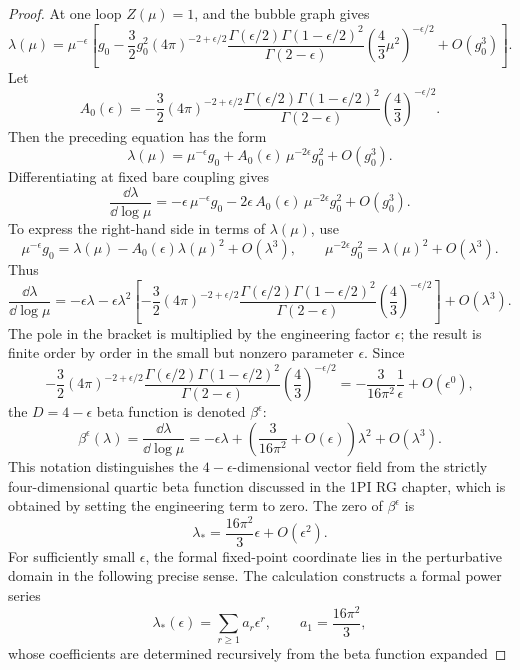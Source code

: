 \begin{proof}
At one loop \(Z(\mu)=1\), and the bubble graph gives
\[
  \lambda(\mu)
  =
  \mu^{-\epsilon}
  \left[
    g_0
    -
    \frac32g_0^2(4\pi)^{-2+\epsilon/2}
    \frac{\Gamma(\epsilon/2)\Gamma(1-\epsilon/2)^2}{\Gamma(2-\epsilon)}
    \left(\frac43\mu^2\right)^{-\epsilon/2}
    +
    O(g_0^3)
  \right].
\]
Let
\[
  A_0(\epsilon)
  =
  -\frac32(4\pi)^{-2+\epsilon/2}
  \frac{\Gamma(\epsilon/2)\Gamma(1-\epsilon/2)^2}{\Gamma(2-\epsilon)}
  \left(\frac43\right)^{-\epsilon/2}.
\]
Then the preceding equation has the form
\[
  \lambda(\mu)
  =
  \mu^{-\epsilon}g_0
  +
  A_0(\epsilon)\,\mu^{-2\epsilon}g_0^2
  +
  O(g_0^3).
\]
Differentiating at fixed bare coupling gives
\[
  \frac{\dd\lambda}{\dd\log\mu}
  =
  -\epsilon\,\mu^{-\epsilon}g_0
  -
  2\epsilon\,A_0(\epsilon)\,\mu^{-2\epsilon}g_0^2
  +
  O(g_0^3).
\]
To express the right-hand side in terms of \(\lambda(\mu)\), use
\[
  \mu^{-\epsilon}g_0
  =
  \lambda(\mu)-A_0(\epsilon)\lambda(\mu)^2+O(\lambda^3),
  \qquad
  \mu^{-2\epsilon}g_0^2
  =
  \lambda(\mu)^2+O(\lambda^3).
\]
Thus
\[
  \frac{\dd\lambda}{\dd\log\mu}
  =
  -\epsilon\lambda
  -
  \epsilon\lambda^2
  \left[
    -\frac32(4\pi)^{-2+\epsilon/2}
    \frac{\Gamma(\epsilon/2)\Gamma(1-\epsilon/2)^2}{\Gamma(2-\epsilon)}
    \left(\frac43\right)^{-\epsilon/2}
  \right]
  +
  O(\lambda^3).
\]
The pole in the bracket is multiplied by the engineering factor \(\epsilon\);
the result is finite order by order in the small but nonzero parameter
\(\epsilon\).
Since
\[
  -\frac32(4\pi)^{-2+\epsilon/2}
  \frac{\Gamma(\epsilon/2)\Gamma(1-\epsilon/2)^2}{\Gamma(2-\epsilon)}
  \left(\frac43\right)^{-\epsilon/2}
  =
  -\frac{3}{16\pi^2}\frac1{\epsilon}+O(\epsilon^0),
\]
the \(D=4-\epsilon\) beta function is denoted \(\beta^\epsilon\):
\[
  \beta^\epsilon(\lambda)
  =
  \frac{\dd\lambda}{\dd\log\mu}
  =
  -\epsilon\lambda
  +
  \left(\frac{3}{16\pi^2}+O(\epsilon)\right)\lambda^2
  +
  O(\lambda^3).
\]
This notation distinguishes the \(4-\epsilon\)-dimensional vector field from
the strictly four-dimensional quartic beta function discussed in the 1PI RG
chapter, which is obtained by setting the engineering term to zero.  The zero
of \(\beta^\epsilon\) is
\[
  \lambda_*
  =
  \frac{16\pi^2}{3}\epsilon+O(\epsilon^2).
\]
For sufficiently small \(\epsilon\), the formal fixed-point coordinate lies in
the perturbative domain in the following precise sense.  The calculation
constructs a formal power series
\[
  \lambda_*(\epsilon)
  =
  \sum_{r\ge1}a_r\epsilon^r,
  \qquad
  a_1=\frac{16\pi^2}{3},
\]
whose coefficients are determined recursively from the beta function expanded

\end{proof}
